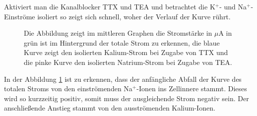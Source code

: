 \documentclass[11pt]{article}
\begin{document}
Aktiviert man die Kanalblocker TTX und TEA und betrachtet die K$^+$- und Na$^+$-Einströme isoliert so zeigt sich schnell, woher der Verlauf der Kurve rührt.  
\begin{figure}[H]
\caption{Die Abbildung zeigt im mittleren Graphen die Stromstärke in $\mu$A in grün ist im Hintergrund der totale Strom zu erkennen, die blaue Kurve zeigt den isolierten Kalium-Strom bei Zugabe von TTX und die pinke Kurve den isolierten Natrium-Strom bei Zugabe von TEA.}
\label{graph_all}
\end{figure}

In der Abbildung \ref{graph_all} ist zu erkennen, dass der anfängliche Abfall der Kurve des totalen Stroms von den einströmenden Na$^+$-Ionen ins Zellinnere stammt. Dieses wird so kurzzeitig positiv, somit muss der ausgleichende Strom negativ sein. Der anschließende Anstieg stammt von den ausströmenden Kalium-Ionen.
\end{document}
